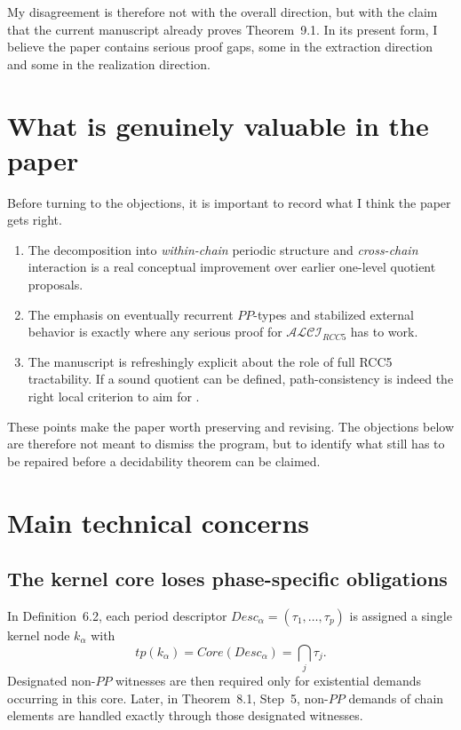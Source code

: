 \documentclass[11pt]{article}
\begin{document}
My disagreement is therefore not with the overall direction, but with the claim that the current manuscript already proves Theorem~9.1. In its present form, I believe the paper contains serious proof gaps, some in the extraction direction and some in the realization direction.

\section{What is genuinely valuable in the paper}

Before turning to the objections, it is important to record what I think the paper gets right.

\begin{enumerate}
  \item The decomposition into \emph{within-chain} periodic structure and \emph{cross-chain} interaction is a real conceptual improvement over earlier one-level quotient proposals.
  \item The emphasis on eventually recurrent $PP$-types and stabilized external behavior is exactly where any serious proof for $\mathcal{ALCI}_{RCC5}$ has to work.
  \item The manuscript is refreshingly explicit about the role of full RCC5 tractability. If a sound quotient can be defined, path-consistency is indeed the right local criterion to aim for \cite{RenzNebel1999}.
\end{enumerate}

These points make the paper worth preserving and revising. The objections below are therefore not meant to dismiss the program, but to identify what still has to be repaired before a decidability theorem can be claimed.

\section{Main technical concerns}

\subsection{The kernel core loses phase-specific obligations}

In Definition~6.2, each period descriptor $Desc_\alpha = (\tau_1,\dots,\tau_p)$ is assigned a single kernel node $k_\alpha$ with
\[
 tp(k_\alpha)=Core(Desc_\alpha)=\bigcap_j \tau_j.
\]
Designated non-$PP$ witnesses are then required only for existential demands occurring in this core. Later, in Theorem~8.1, Step~5, non-$PP$ demands of chain elements are handled exactly through those designated witnesses.
\end{document}
